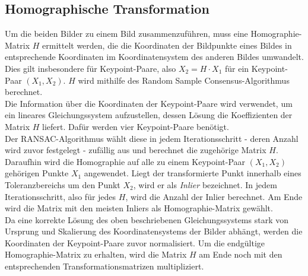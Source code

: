 \documentclass[deutsch]{scrartcl}
\begin{document}
\subsection{Homographische Transformation}
Um die beiden Bilder zu einem Bild zusammenzuführen, muss eine Homographie-Matrix $H$ ermittelt werden, die die Koordinaten der Bildpunkte eines Bildes in entsprechende Koordinaten im Koordinatensystem des anderen Bildes umwandelt. Dies gilt insbesondere für Keypoint-Paare, also $X_2=H\cdot X_1$ für ein Keypoint-Paar $(X_1,X_2)$. $H$ wird mithilfe des Random Sample Consensus-Algorithmus\cite{dubrovsky09} berechnet.\\
Die Information über die Koordinaten der Keypoint-Paare wird verwendet, um ein lineares Gleichungssystem aufzustellen, dessen Lösung die Koeffizienten der Matrix $H$ liefert. Dafür werden vier Keypoint-Paare benötigt.\cite{kriegman07}\\
Der RANSAC-Algorithmus wählt diese in jedem Iterationsschritt - deren Anzahl wird zuvor festgelegt - zufällig aus und berechnet die zugehörige Matrix $H$. Daraufhin wird die Homographie auf alle zu einem Keypoint-Paar $(X_1,X_2)$ gehörigen Punkte $X_1$ angewendet. Liegt der transformierte Punkt innerhalb eines Toleranzbereichs um den Punkt $X_2$, wird er als \textit{Inlier} bezeichnet. In jedem Iterationsschritt, also für jedes $H$, wird die Anzahl der Inlier berechnet. Am Ende wird die Matrix mit den meisten Inliers als Homographie-Matrix gewählt.\\
Da eine korrekte Lösung des oben beschriebenen Gleichungssystems stark von Ursprung und Skalierung des Koordinatensystems der Bilder abhängt, werden die Koordinaten der Keypoint-Paare zuvor normalisiert. Um die endgültige Homographie-Matrix zu erhalten, wird die Matrix $H$ am Ende noch mit den entsprechenden Transformationsmatrizen multipliziert.\cite{dubrovsky09}
\end{document}
